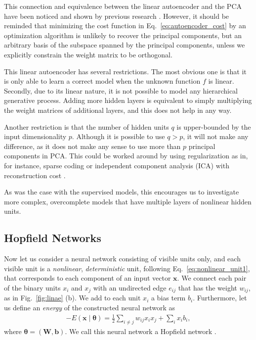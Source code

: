 \documentclass[dissertation,nocontribution]{aaltoseries}
\newcommand{\vect}[1]{\mathbf{#1}}
\newcommand{\vects}[1]{\boldsymbol{#1}}
\newcommand{\matr}[1]{\mathbf{#1}}
\newcommand{\vb}[0]{\vect{b}}
\newcommand{\vx}[0]{\vect{x}}
\newcommand{\mW}[0]{\matr{W}}
\newcommand{\TT}[0]{{\vects{\theta}}}
\begin{document}
This connection and equivalence between the linear
autoencoder and the PCA have been noticed and shown by
previous research \citep[see, for
instance,][]{Oja1982,Baldi1989}. However, it should be
reminded that minimizing the cost function in
Eq.~\eqref{eq:autoencoder_cost} by an optimization
algorithm is unlikely to recover the principal components,
but an arbitrary basis of the subspace spanned by the
principal components, unless we explicitly constrain the
weight matrix to be orthogonal.

This linear autoencoder has several restrictions.  The most
obvious one is that it is only able to learn a correct model
when the unknown function $f$ is linear. 
Secondly, due to its linear nature, it is not possible to
model any hierarchical generative process. Adding more
hidden layers is equivalent to simply multiplying the weight
matrices of additional layers, and this does not help in
any way.

Another restriction is that the number of hidden units $q$
is upper-bounded by the input dimensionality $p$. Although it
is possible to use $q > p$, it will not make any difference,
as it does not make any sense to use more than $p$ principal
components in PCA.  This could be worked around by using
regularization as in, for instance, sparse coding
\citep{Olshausen1996} or independent component analysis
(ICA) with reconstruction cost \citep{Le2011op}. 

As was the case with the supervised models, this encourages
us to investigate more complex, overcomplete models that
have multiple layers of nonlinear hidden units.


\subsection{Hopfield Networks}
\label{sec:hopfield_network}

Now let us consider a neural network consisting of visible
units only, and each visible unit is a \textit{nonlinear},
\textit{deterministic} unit, following
Eq.~\eqref{eq:nonlinear_unit1}, that corresponds to each
component of an input vector $\vx$. We connect each pair of
the binary units $x_i$ and $x_j$ with an undirected edge $e_{ij}$
that has the weight $w_{ij}$, as in Fig.~\ref{fig:linae}
(b).  We add to each unit $x_i$ a bias term $b_i$.
Furthermore, let us define an \textit{energy} of the
constructed neural network as
\begin{align}
    \label{eq:hopfield_energy}
    -E(\vx \mid \TT) = \frac{1}{2} \sum_{i \neq j} w_{ij}
    x_i x_j + \sum_i x_i b_i,
\end{align}
where $\TT = \left( \mW, \vb \right)$.  We call this neural
network a Hopfield network \citep{Hopfield1982}.
\end{document}
